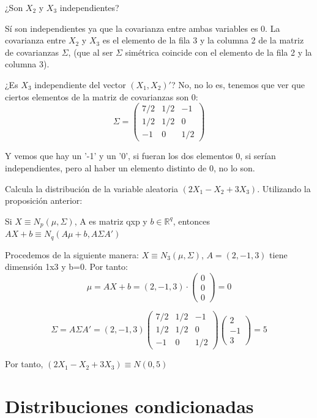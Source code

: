 \documentclass[palatino,nochap]{apuntes}
\begin{document}
\ppart ¿Son $X_2$ y $X_3$ independientes?

Sí son independientes ya que la covarianza entre ambas variables es 0. La covarianza entre $X_2$ y $X_3$ es el elemento de la fila 3 y la columna 2 de la matriz de covarianzas $\Sigma$, (que al ser $\Sigma$ simétrica coincide con el elemento de la fila 2 y la columna 3).

\ppart ¿Es $X_3$ independiente del vector $(X_1, X_2)'$?
No, no lo es, tenemos que ver que ciertos elementos de la matriz de covarianzas son 0:
\[
\Sigma=
\left(
\begin{array}{cc|c}
7/2& 1/2& -1 \\
1/2& 1/2& 0 \\
\hline
-1& 0& 1/2
\end{array}
\right)
\]

Y vemos que hay un '-1' y un '0', si fueran los dos elementos 0, si serían independientes, pero al haber un elemento distinto de 0, no lo son.


\ppart Calcula la  distribución de la variable aleatoria $(2X_1-X_2+3X_3)$. Utilizando la proposición anterior:

Si $X \equiv N_p(\mu, \Sigma)$, A es matriz qxp y $b\in \mathbb{R}^q$, entonces $AX+b \equiv N_q(A\mu +b, A\Sigma A')$ 

Procedemos de la siguiente manera: $X\equiv N_3(\mu, \Sigma)$, $A=(2,-1,3)$ tiene dimensión 1x3 y b=0. Por tanto:
\[
\mu=AX+b = (2,-1,3)\cdot
\left(
\begin{array}{c}
0 \\
0 \\
0
\end{array}
\right) = 0 
\]

\[
\Sigma = A\Sigma A'=(2,-1,3)
\left(
\begin{array}{ccc}
7/2& 1/2& -1 \\
1/2& 1/2& 0 \\
-1& 0& 1/2
\end{array}
\right) \left(
\begin{array}{c}
2 \\
-1 \\
3
\end{array}
\right)=5
\]

Por tanto, $(2X_1-X_2+3X_3)\equiv N(0,5)$



\section{Distribuciones condicionadas}
\end{document}
